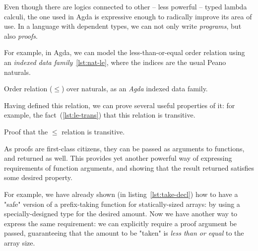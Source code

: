 
            Even though there are logics connected to other -- less powerful -- typed lambda calculi,
            the one used in Agda is expressive enough to radically improve its area of use.
            In a language with dependent types, we can not only write \emph{programs}, but also \emph{proofs}.

            For example, in Agda, we can model the less-than-or-equal order relation using an
            \emph{indexed data family}~\ref{lst:nat-le}, where the indices are the usual Peano naturals.

            \begin{listing}[h]
                \caption{Order relation ($\le$) over naturals, as an \emph{Agda} indexed data family.
                    \label{lst:nat-le}}
            \end{listing}

            Having defined this relation, we can prove several useful properties of it:
            for example, the fact~(\ref{lst:le-trans}) that this relation is transitive.

            \begin{listing}[h]
                \caption{Proof that the $\le$ relation is transitive. \label{lst:le-trans}}
            \end{listing}

            As proofs are first-class citizens, they can be passed as arguments to functions,
            and returned as well.
            This provides yet another powerful way of expressing requirements of function arguments,
            and showing that the result returned satisfies some desired property.

            For example, we have already shown (in listing~\ref{lst:take-decl}) how to have a "safe"
            version of a prefix-taking function for statically-sized arrays:
            by using a specially-designed type for the desired amount.
            Now we have another way to express the same requirement:
            we can explicitly require a proof argument be passed,
            guaranteeing that the amount to be "taken" is \emph{less than or equal} to the array size.

            \begin{listing}[h]
            \end{listing}

